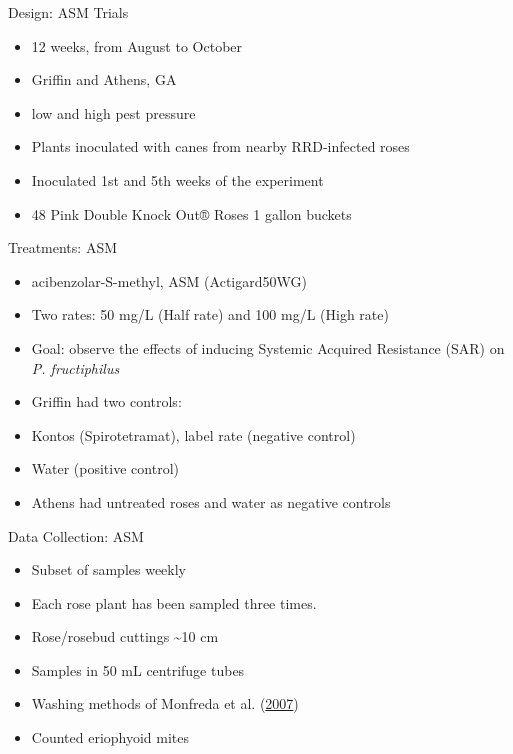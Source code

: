 \documentclass[
  ignorenonframetext,
]{beamer}
\providecommand{\tightlist}{%
  \setlength{\itemsep}{0pt}\setlength{\parskip}{0pt}}
\begin{document}
\begin{frame}
\begin{block}{Design: ASM Trials}
\protect\hypertarget{design-asm-trials}{}
\begin{itemize}
\tightlist
\item
  12 weeks, from August to October
\item
  Griffin and Athens, GA
\item
  low and high pest pressure
\item
  Plants inoculated with canes from nearby RRD-infected roses
\item
  Inoculated 1st and 5th weeks of the experiment
\item
  48 Pink Double Knock Out® Roses 1 gallon buckets
\end{itemize}
\end{block}

\begin{block}{Treatments: ASM}
\protect\hypertarget{treatments-asm}{}
\begin{itemize}
\tightlist
\item
  acibenzolar-S-methyl, ASM (Actigard50WG)
\item
  Two rates: 50 \si{\milli\gram}/\si{\liter} (Half rate) and 100
  \si{\milli\gram}/\si{\liter} (High rate)
\item
  Goal: observe the effects of inducing Systemic Acquired Resistance
  (SAR) on \emph{P. fructiphilus}
\item
  Griffin had two controls:
\item
  Kontos (Spirotetramat), label rate (negative control)
\item
  Water (positive control)
\item
  Athens had untreated roses and water as negative controls
\end{itemize}
\end{block}

\begin{block}{Data Collection: ASM}
\protect\hypertarget{data-collection-asm}{}
\begin{itemize}
\tightlist
\item
  Subset of samples weekly
\item
  Each rose plant has been sampled three times.
\item
  Rose/rosebud cuttings \textasciitilde10 cm
\item
  Samples in 50 mL centrifuge tubes
\item
  Washing methods of Monfreda et al.
  (\protect\hyperlink{ref-Monfreda2007}{2007})
\item
  Counted eriophyoid mites
\end{itemize}
\end{block}


\end{frame}
\end{document}
